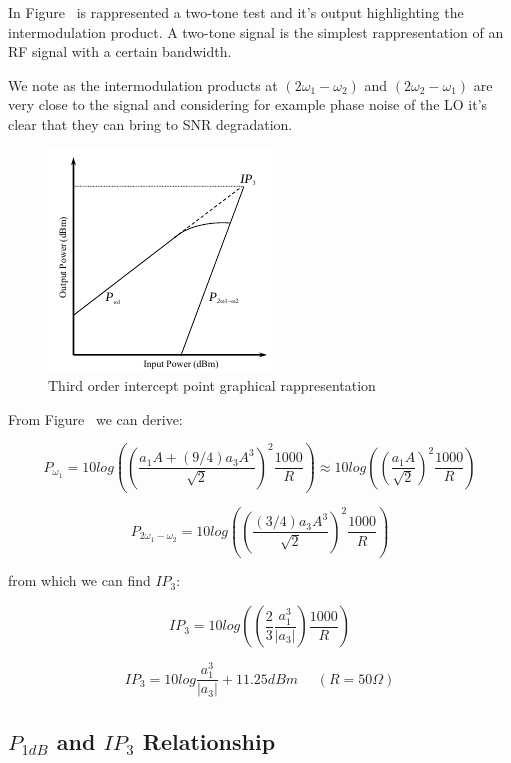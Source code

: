 In Figure~\label{fig:spec} is rappresented a two-tone test and it's output highlighting the intermodulation product.
A two-tone signal is the simplest rappresentation of an RF signal with a certain bandwidth.

We note as the intermodulation products at $(2\omega_1-\omega_2)$ and $(2\omega_2-\omega_1)$ are very close to the signal and considering for example phase noise of the LO it's clear that they can bring to SNR degradation.

\begin{figure}[h]
	\centering
	\includegraphics[scale=0.8]{Immagini/ip3}
	\caption{Third order intercept point graphical rappresentation}
	\label{fig:ip3}
\end{figure}


From Figure~\label{fig:ip3} we can derive:

\begin{equation}
	P_{\omega_1}= 10log\left(\left( \frac{a_1A+(9/4)a_3A^3}{\sqrt{2}}\right)^2\frac{1000}{R}\right) \approx 10log\left(\left( \frac{a_1A}{\sqrt{2}}\right)^2\frac{1000}{R}\right)
\end{equation}

\begin{equation}
	P_{2\omega_1-\omega_2}= 10log\left(\left( \frac{(3/4)a_3A^3}{\sqrt{2}}\right)^2\frac{1000}{R}\right)
\end{equation}

from which we can find $IP_3$:

\begin{equation}
	IP_3= 10log\left(\left( \frac{2}{3} \frac{a_1^3}{|a_3|}\right)\frac{1000}{R}\right)
\end{equation}

\begin{equation}
	IP_3 = 10log\frac{a_1^3}{|a_3|}+11.25dBm   \ \ \ \ \ \ (R= 50\Omega)
\end{equation}


\subsection{$P_{1dB}$ and $IP_3$ Relationship} %
\label{sub:_p_1dB_and_ip_3_relationship}


